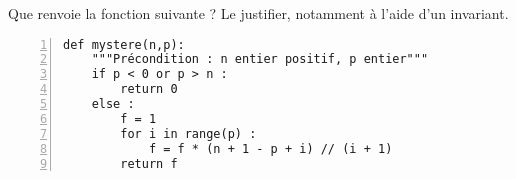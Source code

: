 Que renvoie la fonction suivante ? Le justifier, notamment à l'aide d'un invariant. 
\begin{Verbatim}[gobble=0,numbers=left]
def mystere(n,p):
    """Précondition : n entier positif, p entier"""
    if p < 0 or p > n : 
        return 0
    else : 
        f = 1
        for i in range(p) : 
            f = f * (n + 1 - p + i) // (i + 1)
        return f
\end{Verbatim}
